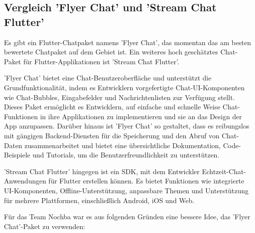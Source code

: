 \subsection{Vergleich 'Flyer Chat' und 'Stream Chat Flutter'}

Es gibt ein Flutter-Chatpaket namens 'Flyer Chat', das momentan das am besten bewertete Chatpaket auf dem Gebiet ist. Ein weiteres hoch geschätztes Chat-Paket für Flutter-Applikationen ist 'Stream Chat Flutter'.

'Flyer Chat' bietet eine Chat-Benutzeroberfläche und unterstützt die Grundfunktionalität, indem es Entwicklern vorgefertigte Chat-UI-Komponenten wie Chat-Bubbles, Eingabefelder und Nachrichtenlisten zur Verfügung stellt. Dieses Paket ermöglicht es Entwicklern, auf einfache und schnelle Weise Chat-Funktionen in ihre Applikationen zu implementieren und sie an das Design der App anzupassen. Darüber hinaus ist 'Flyer Chat' so gestaltet, dass es reibungslos mit gängigen Backend-Diensten für die Speicherung und den Abruf von Chat-Daten zusammenarbeitet und bietet eine übersichtliche Dokumentation, Code-Beispiele und Tutorials, um die Benutzerfreundlichkeit zu unterstützen.

'Stream Chat Flutter' hingegen ist ein SDK, mit dem Entwickler Echtzeit-Chat-Anwendungen für Flutter erstellen können. Es bietet Funktionen wie integrierte UI-Komponenten, Offline-Unterstützung, anpassbare Themen und Unterstützung für mehrere Plattformen, einschließlich Android, iOS und Web.

Für das Team Nochba war es aus folgenden Gründen eine bessere Idee, das 'Flyer Chat'-Paket zu verwenden:

